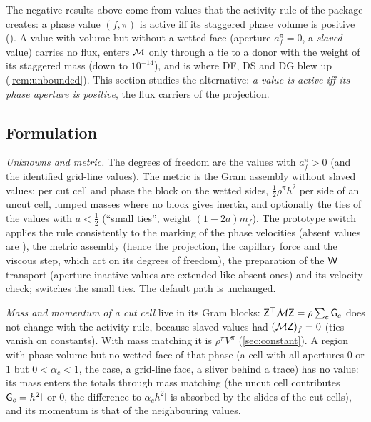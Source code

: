 The negative results above come from values that the activity rule of the package creates:
a phase value $(f,\pi)$ is active iff its staggered phase volume is positive
().  A value with volume but without a wetted face
(aperture $a^\pi_f=0$, a \emph{slaved} value) carries no flux, enters $\mathcal M$ only through a tie
to a donor with the weight of its staggered mass (down to $10^{-14}$), and is where DF, DS and
DG blew up (\cref{rem:unbounded}).  This section studies the alternative: \emph{a value is
active iff its phase aperture is positive}, the flux carriers of the projection.

\subsection{Formulation}\label{sec:ap:formulation}
\emph{Unknowns and metric.}  The degrees of freedom are the values with $a^\pi_f>0$ (and the
identified grid-line values).  The metric is the Gram assembly without slaved values: per cut
cell and phase the block on the wetted sides, $\tfrac12\rho^\pi h^2$ per side of an uncut
cell, lumped masses where no block gives inertia, and optionally the ties of the values with
$a<\tfrac12$ (``small ties'', weight $(1-2a)m_f$).  The prototype switch
 applies the rule consistently to the marking of the
phase velocities (absent values are ), the metric assembly (hence the projection,
the capillary force and the viscous step, which act on its degrees of freedom), the
preparation of the $\mathsf W$ transport (aperture-inactive values are extended like absent ones)
and its velocity check;  switches the small ties.  The default
path is unchanged.

\emph{Mass and momentum of a cut cell} live in its Gram blocks: $\mathsf Z^\top\mathcal M\mathsf Z=\rho\sum_c\mathsf G_c$
does not change with the activity rule, because slaved values had $(\mathcal M\mathsf Z)_f=0$ (ties vanish on
constants).  With mass matching it is $\rho^\pi V^\pi$ (\cref{sec:constant}).  A region with
phase volume but no wetted face of that phase (a cell with all apertures $0$ or $1$ but
$0<\alpha_c<1$, the  case, a grid-line face, a sliver behind a trace) has no
value: its mass enters the totals through mass matching (the uncut cell contributes
$\mathsf G_c=h^2\mathsf I$ or $0$, the difference to $\alpha_ch^2\mathsf I$ is absorbed by the slides of
the cut cells), and its momentum is that of the neighbouring values.

